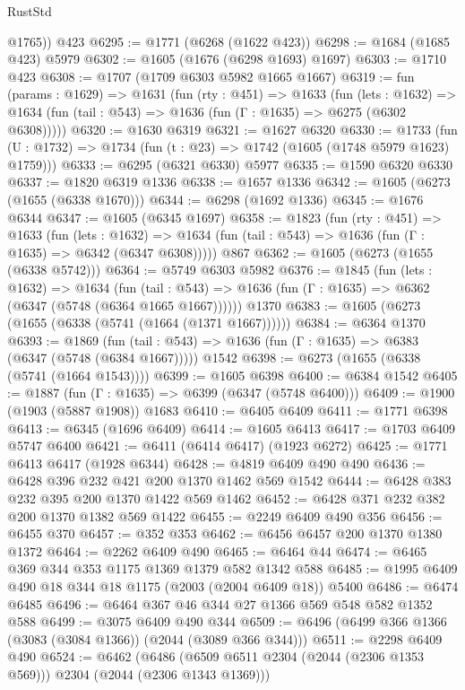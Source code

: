 \begin{lexlean}{RustStd}
\begin{coremodule}
{\begin{coremodule}
{{{{{{{{{{{{{{        @1765))
    @423
@6295 := @1771 (@6268 (@1622 @423))
@6298 := @1684 (@1685 @423) @5979
@6302 := @1605 (@1676 (@6298 @1693) @1697)
@6303 := @1710 @423
@6308 := @1707 (@1709 @6303 @5982 @1665 @1667)
@6319 := fun (params : @1629) =>
  @1631
    (fun (rty : @451) =>
    @1633
      (fun (lets : @1632) =>
      @1634 (fun (tail : @543) => @1636 (fun (Γ : @1635) => @6275 (@6302 @6308)))))
@6320 := @1630 @6319
@6321 := @1627 @6320
@6330 := @1733 (fun (U : @1732) => @1734 (fun (t : @23) => @1742 (@1605 (@1748 @5979 @1623) @1759)))
@6333 := @6295 (@6321 @6330) @5977
@6335 := @1590 @6320 @6330
@6337 := @1820 @6319 @1336
@6338 := @1657 @1336
@6342 := @1605 (@6273 (@1655 (@6338 @1670)))
@6344 := @6298 (@1692 @1336)
@6345 := @1676 @6344
@6347 := @1605 (@6345 @1697)
@6358 := @1823
    (fun (rty : @451) =>
    @1633
      (fun (lets : @1632) =>
      @1634 (fun (tail : @543) => @1636 (fun (Γ : @1635) => @6342 (@6347 @6308)))))
    @867
@6362 := @1605 (@6273 (@1655 (@6338 @5742)))
@6364 := @5749 @6303 @5982
@6376 := @1845
    (fun (lets : @1632) =>
    @1634
      (fun (tail : @543) => @1636 (fun (Γ : @1635) => @6362 (@6347 (@5748 (@6364 @1665 @1667))))))
    @1370
@6383 := @1605 (@6273 (@1655 (@6338 (@5741 (@1664 (@1371 @1667))))))
@6384 := @6364 @1370
@6393 := @1869
    (fun (tail : @543) => @1636 (fun (Γ : @1635) => @6383 (@6347 (@5748 (@6384 @1667)))))
    @1542
@6398 := @6273 (@1655 (@6338 (@5741 (@1664 @1543))))
@6399 := @1605 @6398
@6400 := @6384 @1542
@6405 := @1887 (fun (Γ : @1635) => @6399 (@6347 (@5748 @6400)))
@6409 := @1900 (@1903 (@5887 @1908)) @1683
@6410 := @6405 @6409
@6411 := @1771 @6398
@6413 := @6345 (@1696 @6409)
@6414 := @1605 @6413
@6417 := @1703 @6409 @5747 @6400
@6421 := @6411 (@6414 @6417) (@1923 @6272)
@6425 := @1771 @6413 @6417 (@1928 @6344)
@6428 := @4819 @6409 @490 @490
@6436 := @6428 @396 @232 @421 @200 @1370 @1462 @569 @1542
@6444 := @6428 @383 @232 @395 @200 @1370 @1422 @569 @1462
@6452 := @6428 @371 @232 @382 @200 @1370 @1382 @569 @1422
@6455 := @2249 @6409 @490 @356
@6456 := @6455 @370
@6457 := @352 @353
@6462 := @6456 @6457 @200 @1370 @1380 @1372
@6464 := @2262 @6409 @490
@6465 := @6464 @44
@6474 := @6465 @369 @344 @353 @1175 @1369 @1379 @582 @1342 @588
@6485 := @1995 @6409 @490 @18 @344 @18 @1175 (@2003 (@2004 @6409 @18)) @5400
@6486 := @6474 @6485
@6496 := @6464 @367 @46 @344 @27 @1366 @569 @548 @582 @1352 @588
@6499 := @3075 @6409 @490 @344
@6509 := @6496 (@6499 @366 @1366 (@3083 (@3084 @1366)) (@2044 (@3089 @366 @344)))
@6511 := @2298 @6409 @490
@6524 := @6462
    (@6486 (@6509 @6511 @2304 (@2044 (@2306 @1353 @569))) @2304 (@2044 (@2306 @1343 @1369)))
}}}}}}}}}}}}}}
\end{coremodule}}
\end{coremodule}
\end{lexlean}
